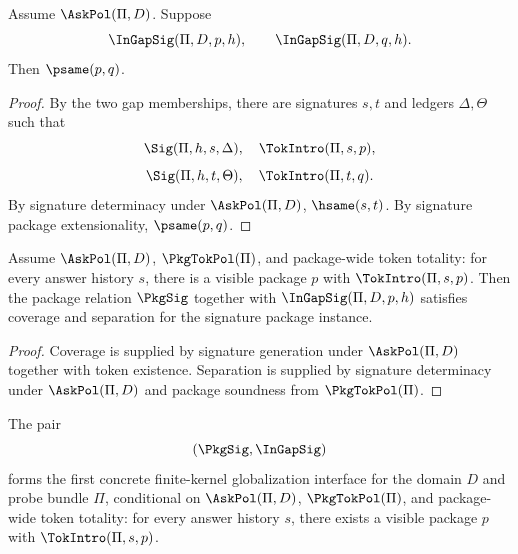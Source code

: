 \begin{lemma}
\label{lem:concrete-gap-separation}
Assume $\AskPol(\Pi,D)$. Suppose
$$
  \InGapSig(\Pi,D,p,h),
  \qquad
  \InGapSig(\Pi,D,q,h).
$$
Then $\psame(p,q)$.
\end{lemma}
\begin{proof}
By the two gap memberships, there are signatures $s,t$ and ledgers $\Delta,\Theta$ such that
$$
  \Sig(\Pi,h,s,\Delta),\quad \TokIntro(\Pi,s,p),
$$
$$
  \Sig(\Pi,h,t,\Theta),\quad \TokIntro(\Pi,t,q).
$$
By signature determinacy under $\AskPol(\Pi,D)$, $\hsame(s,t)$. By signature package extensionality, $\psame(p,q)$.
\end{proof}

\begin{theorem}
\label{thm:concrete-gap-policy}
Assume $\AskPol(\Pi,D)$, $\PkgTokPol(\Pi)$, and package-wide token totality: for every answer history $s$, there is a visible package $p$ with $\TokIntro(\Pi,s,p)$. Then the package relation $\PkgSig$ together with $\InGapSig(\Pi,D,p,h)$ satisfies coverage and separation for the signature package instance.
\end{theorem}
\begin{proof}
Coverage is supplied by signature generation under $\AskPol(\Pi,D)$ together with token existence. Separation is supplied by signature determinacy under $\AskPol(\Pi,D)$ and package soundness from $\PkgTokPol(\Pi)$.
\end{proof}

\begin{corollary}
\label{cor:first-concrete-globalization-ledger}
The pair
$$
  (\PkgSig,\InGapSig)
$$
forms the first concrete finite-kernel globalization interface for the domain $D$ and probe bundle $\Pi$, conditional on $\AskPol(\Pi,D)$, $\PkgTokPol(\Pi)$, and package-wide token totality: for every answer history $s$, there exists a visible package $p$ with $\TokIntro(\Pi,s,p)$.
\end{corollary}
